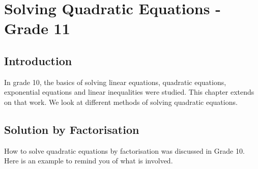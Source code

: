 \chapter{Solving Quadratic Equations - Grade 11}
\label{m:se:q11}


\section{Introduction}
In grade 10, the basics of solving linear equations, quadratic equations, exponential equations and linear inequalities were studied. This chapter extends on that work. We look at different methods of solving quadratic equations.

\section{Solution by Factorisation}

How to solve quadratic equations by factorisation was discussed in Grade 10. Here is an example to remind you of what is involved.

